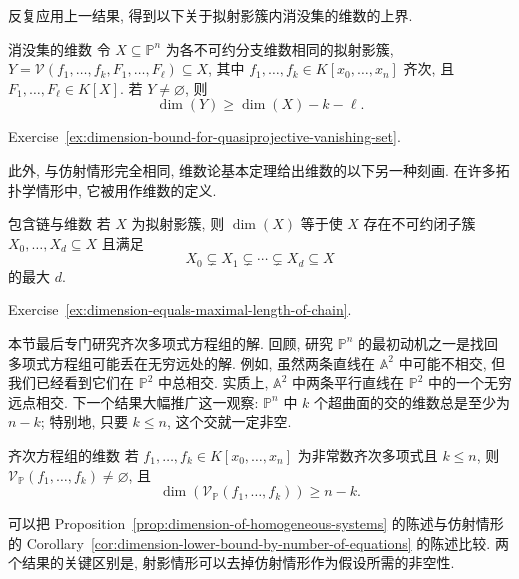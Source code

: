 反复应用上一结果, 得到以下关于拟射影簇内消没集的维数的上界.

\begin{Corollary}{消没集的维数}\leavevmode\label{cor:dimension-bound-for-quasiprojective-vanishing-set}
令 $X\subseteq\mathbb{P}^{n}$ 为各不可约分支维数相同的拟射影簇, $Y=\mathcal{V}(f_{1},\ldots,f_{k},F_{1},\ldots,F_{\ell})\subseteq X$, 其中 $f_{1},\ldots,f_{k}\in K[x_{0},\ldots,x_{n}]$ 齐次, 且 $F_{1},\ldots,F_{\ell}\in K[X]$. 若 $Y\ne\varnothing$, 则
\[
  \dim(Y)\ge\dim(X)-k-\ell.
\]
\end{Corollary}
\begin{Proof}
Exercise~\ref{ex:dimension-bound-for-quasiprojective-vanishing-set}.
\end{Proof}

此外, 与仿射情形完全相同, 维数论基本定理给出维数的以下另一种刻画. 在许多拓扑学情形中, 它被用作维数的定义.

\begin{Corollary}{包含链与维数}\leavevmode\label{cor:dimension-is-length-of-irreducible-closed-chain}
若 $X$ 为拟射影簇, 则 $\dim(X)$ 等于使 $X$ 存在不可约闭子簇 $X_{0},\ldots,X_{d}\subseteq X$ 且满足
\[
  X_{0}\subsetneq X_{1}\subsetneq\cdots\subsetneq X_{d}\subseteq X
\]
的最大 $d$.
\end{Corollary}
\begin{Proof}
Exercise~\ref{ex:dimension-equals-maximal-length-of-chain}.
\end{Proof}

本节最后专门研究齐次多项式方程组的解. 回顾, 研究 $\mathbb{P}^{n}$ 的最初动机之一是找回多项式方程组可能\textquotedbl{}丢在无穷远处\textquotedbl{}的解. 例如, 虽然两条直线在 $\mathbb{A}^{2}$ 中可能不相交, 但我们已经看到它们在 $\mathbb{P}^{2}$ 中总相交. 实质上, $\mathbb{A}^{2}$ 中两条平行直线在 $\mathbb{P}^{2}$ 中的一个\textquotedbl{}无穷远点\textquotedbl{}相交. 下一个结果大幅推广这一观察: $\mathbb{P}^{n}$ 中 $k$ 个超曲面的交的维数总是至少为 $n-k$; 特别地, 只要 $k\le n$, 这个交就一定非空.

\begin{Proposition}{齐次方程组的维数}\leavevmode\label{prop:dimension-of-homogeneous-systems}
若 $f_{1},\ldots,f_{k}\in K[x_{0},\ldots,x_{n}]$ 为非常数齐次多项式且 $k\le n$, 则 $\mathcal{V}_{\mathbb{P}}(f_{1},\ldots,f_{k})\ne\varnothing$, 且
\[
  \dim(\mathcal{V}_{\mathbb{P}}(f_{1},\ldots,f_{k}))\ge n-k.
\]
\end{Proposition}

可以把 Proposition~\ref{prop:dimension-of-homogeneous-systems} 的陈述与仿射情形的 Corollary~\ref{cor:dimension-lower-bound-by-number-of-equations} 的陈述比较. 两个结果的关键区别是, 射影情形可以去掉仿射情形作为假设所需的非空性.

